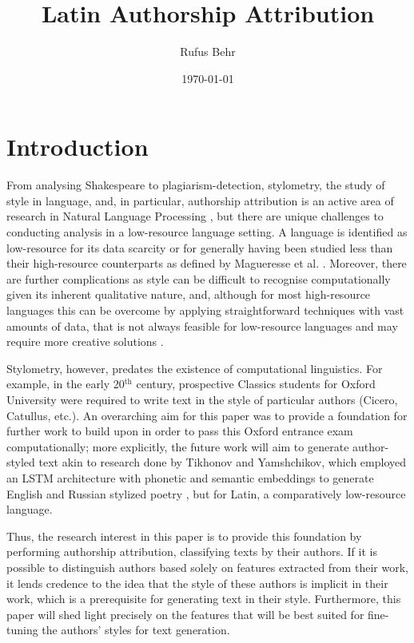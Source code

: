 \documentclass{csfourzero}
\title{Latin Authorship Attribution}
\author{Rufus Behr}
\date{\today}
\begin{document}
\maketitle


\section{Introduction}
\label{sec:intro}
From analysing Shakespeare to plagiarism-detection, stylometry, the study of style in language, and, in particular, authorship attribution is an active area of research in Natural Language Processing \cite{inproceedings}, but there are unique challenges to conducting analysis in a low-resource language setting. A language is identified as low-resource for its data scarcity or for generally having been studied less than their high-resource counterparts as defined by Magueresse et al. \cite{https://doi.org/10.48550/arxiv.2006.07264}.  Moreover, there are further complications as style can be difficult to recognise computationally given its inherent qualitative nature, and, although for most high-resource languages this can be overcome by applying straightforward techniques with vast amounts of data, that is not always feasible for low-resource languages and may require more creative solutions \cite{inproceedings}. 

Stylometry, however, predates the existence of computational linguistics. For example, in the early 20$^{\text{th}}$ century, prospective Classics students for Oxford University were required to write text in the style of particular authors (Cicero, Catullus, etc.). An overarching aim for this paper was to provide a foundation for further work to build upon in order to pass this Oxford entrance exam computationally; more explicitly, the future work will aim to generate author-styled text akin to research done by Tikhonov and Yamshchikov, which employed an LSTM architecture with phonetic and semantic embeddings to generate English and Russian stylized poetry \cite{Tikhonov_2018}, but for Latin, a comparatively low-resource language. 

Thus, the research interest in this paper is to provide this foundation by performing authorship attribution, classifying texts by their authors. If it is possible to distinguish authors based solely on features extracted from their work, it lends credence to the idea that the style of these authors is implicit in their work, which is a prerequisite for generating text in their style. Furthermore, this paper will shed light precisely on the features that will be best suited for fine-tuning the authors’ styles for text generation. 
\end{document}
